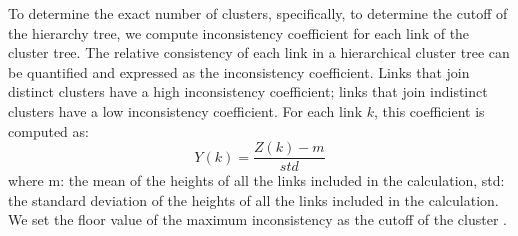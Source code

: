 \documentclass{article}
\begin{document}
To determine the exact number of clusters, specifically, to determine the cutoff of the hierarchy tree, we compute inconsistency coefficient for each link of the cluster tree. The relative consistency of each link in a hierarchical cluster tree can be quantified and expressed as the inconsistency coefficient. Links that join distinct clusters have a high inconsistency coefficient; links that join indistinct clusters have a low inconsistency coefficient. For each link $k$, this coefficient is computed as: $$Y(k)=\frac{Z(k) - m}{std}$$ where m: the mean of the heights of all the links included in the calculation, std: the standard deviation of the heights of all the links included in the calculation. We set the floor value of the maximum inconsistency as the cutoff of the cluster \cite{jain-88}.



\end{document}
